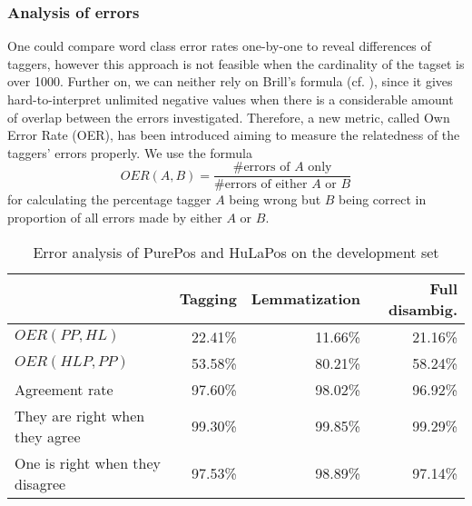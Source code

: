\subsubsection{Analysis of errors}

One could compare word class error rates one-by-one to reveal differences of taggers, however this approach is not feasible when the cardinality of the tagset is over 1000. 
Further on, we can neither rely on Brill's formula (cf. \cite{Brill1998}), since it gives hard-to-interpret unlimited negative values when there is a considerable amount of overlap between the errors investigated. 
Therefore, a new metric, called Own Error Rate (OER), has been introduced aiming to measure the relatedness of the taggers' errors properly.
We use the formula 
\begin{equation}
OER(A,B)=\frac{\text{\#errors of }A\text{ only}}{\text{\#errors of either }A\text{ or }B}
\end{equation}
for calculating the percentage tagger $A$ being wrong but $B$ being correct in proportion of all errors made by either $A$ or $B$.


\begin{table}[h]
\centering
\caption{Error analysis of PurePos and HuLaPos on the development set}\label{tab:disambig-comp}
\begin{tabular}{l r r r}
\hline
& Tagging & Lemmatization & Full disambig. \\
\hline
$OER(PP, HL)$ & 22.41\% & 11.66\% & 21.16\% \\ %
$OER(HLP, PP)$ & 53.58\% & 80.21\% & 58.24\% \\
Agreement rate & 97.60\% & 98.02\% & 96.92\% \\
They are right when they agree & 99.30\% & 99.85\% & 99.29\% \\
One is right when they disagree & 97.53\% & 98.89\% & 97.14\% \\
\hline
\end{tabular}
\end{table}

